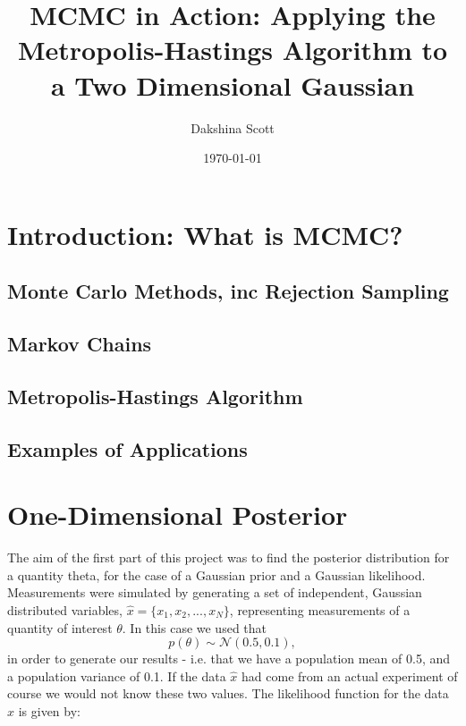 \documentclass[a4paper,11pt,twoside]{article}
\begin{document}
 
\title{MCMC in Action: Applying the Metropolis-Hastings Algorithm to a Two
Dimensional Gaussian}

\date{\today} 
\author{Dakshina Scott} 
\maketitle

\begin{abstract} 
\end{abstract}

\tableofcontents

\section{Introduction: What is MCMC?} 
\subsection{Monte Carlo Methods, inc Rejection Sampling}

\subsection{Markov Chains} 
\subsection{Metropolis-Hastings Algorithm}
\subsection{Examples of Applications}

\section{One-Dimensional Posterior} 
The aim of the first part of this project was to find the posterior
distribution for a quantity theta, for the case of a Gaussian prior and a
Gaussian likelihood. Measurements were simulated by generating a set of
independent, Gaussian distributed variables, $\hat{x} = \{x_1, x_2, ..., x_N\}$, representing measurements of a quantity of interest $\theta$. In this case we used that
\begin{equation}
	\label{eq:measurements}
	p(\theta) \sim \mathcal{N}(0.5, 0.1),
\end{equation}
in order to generate our results - i.e. that we have a population mean of 0.5, and a population variance of 0.1. If the data $\hat{x}$ had come from an actual experiment of course we would not know these two values.
The likelihood function for the data $\hat{x}$ is given by:
\end{document}
